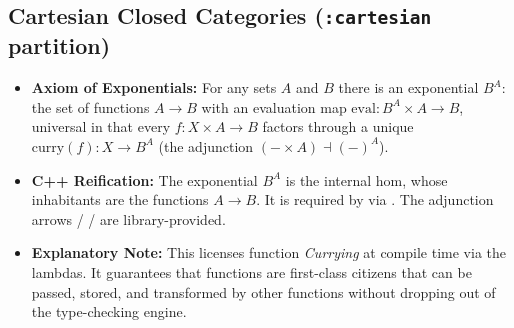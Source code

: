 \documentclass[11pt, a4paper]{article}
\begin{document}
\subsection{Cartesian Closed Categories (\texttt{:cartesian} partition)}
\begin{itemize}
    \item \textbf{Axiom of Exponentials:} For any sets $A$ and $B$ there is an exponential $B^A$: the set of functions $A \to B$ with an evaluation map $\mathrm{eval}: B^A \times A \to B$, universal in that every $f: X \times A \to B$ factors through a unique $\mathrm{curry}(f): X \to B^A$ (the adjunction $(-\times A) \dashv (-)^A$).
    \item \textbf{C++ Reification:} The exponential $B^A$ is the internal hom, whose inhabitants are the functions $A \to B$. It is required by  via . The adjunction arrows  /  /  are library-provided.
    \item \textbf{Explanatory Note:} This licenses function \textit{Currying} at compile time via the  lambdas. It guarantees that functions are first-class citizens that can be passed, stored, and transformed by other functions without dropping out of the type-checking engine.
\end{itemize}
\end{document}
